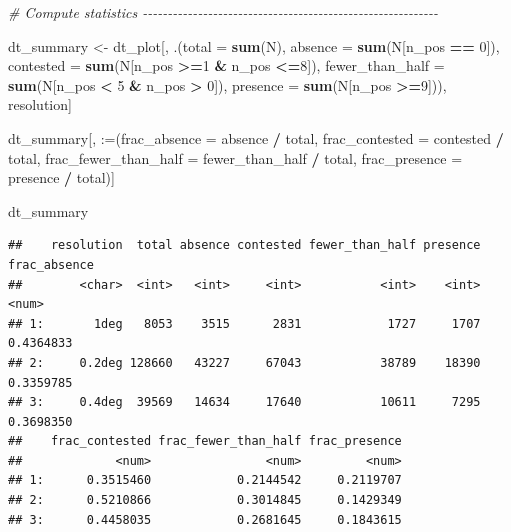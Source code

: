 \documentclass[
  11pt,
]{article}
\newenvironment{Shaded}{\begin{snugshade}}{\end{snugshade}}
\newcommand{\AttributeTok}[1]{\textcolor[rgb]{0.13,0.29,0.53}{#1}}
\newcommand{\CommentTok}[1]{\textcolor[rgb]{0.56,0.35,0.01}{\textit{#1}}}
\newcommand{\DecValTok}[1]{\textcolor[rgb]{0.00,0.00,0.81}{#1}}
\newcommand{\FunctionTok}[1]{\textcolor[rgb]{0.13,0.29,0.53}{\textbf{#1}}}
\newcommand{\NormalTok}[1]{#1}
\newcommand{\OtherTok}[1]{\textcolor[rgb]{0.56,0.35,0.01}{#1}}
\newcommand{\SpecialCharTok}[1]{\textcolor[rgb]{0.81,0.36,0.00}{\textbf{#1}}}
\newcommand{\StringTok}[1]{\textcolor[rgb]{0.31,0.60,0.02}{#1}}
\begin{document}
\begin{Shaded}
\begin{Highlighting}[]
\CommentTok{\# Compute statistics {-}{-}{-}{-}{-}{-}{-}{-}{-}{-}{-}{-}{-}{-}{-}{-}{-}{-}{-}{-}{-}{-}{-}{-}{-}{-}{-}{-}{-}{-}{-}{-}{-}{-}{-}{-}{-}{-}{-}{-}{-}{-}{-}{-}{-}{-}{-}{-}{-}{-}{-}{-}{-}{-}{-}{-}{-}{-}{-}}

\NormalTok{dt\_summary }\OtherTok{\textless{}{-}}\NormalTok{ dt\_plot[, .(}\AttributeTok{total =} \FunctionTok{sum}\NormalTok{(N),}
                          \AttributeTok{absence =} \FunctionTok{sum}\NormalTok{(N[n\_pos }\SpecialCharTok{==} \DecValTok{0}\NormalTok{]),}
                          \AttributeTok{contested =} \FunctionTok{sum}\NormalTok{(N[n\_pos }\SpecialCharTok{\textgreater{}=}\DecValTok{1} \SpecialCharTok{\&}\NormalTok{ n\_pos }\SpecialCharTok{\textless{}=}\DecValTok{8}\NormalTok{]),}
                          \AttributeTok{fewer\_than\_half =} \FunctionTok{sum}\NormalTok{(N[n\_pos }\SpecialCharTok{\textless{}} \DecValTok{5} \SpecialCharTok{\&}\NormalTok{ n\_pos }\SpecialCharTok{\textgreater{}} \DecValTok{0}\NormalTok{]),}
                          \AttributeTok{presence =} \FunctionTok{sum}\NormalTok{(N[n\_pos }\SpecialCharTok{\textgreater{}=}\DecValTok{9}\NormalTok{])),}
\NormalTok{                      resolution]}

\NormalTok{dt\_summary[, }\StringTok{\textasciigrave{}}\AttributeTok{:=}\StringTok{\textasciigrave{}}\NormalTok{(}\AttributeTok{frac\_absence =}\NormalTok{ absence }\SpecialCharTok{/}\NormalTok{ total,}
                  \AttributeTok{frac\_contested =}\NormalTok{ contested }\SpecialCharTok{/}\NormalTok{ total,}
                  \AttributeTok{frac\_fewer\_than\_half =}\NormalTok{ fewer\_than\_half }\SpecialCharTok{/}\NormalTok{ total,}
                  \AttributeTok{frac\_presence =}\NormalTok{ presence }\SpecialCharTok{/}\NormalTok{ total)]}

\NormalTok{dt\_summary}
\end{Highlighting}
\end{Shaded}

\begin{verbatim}
##    resolution  total absence contested fewer_than_half presence frac_absence
##        <char>  <int>   <int>     <int>           <int>    <int>        <num>
## 1:       1deg   8053    3515      2831            1727     1707    0.4364833
## 2:     0.2deg 128660   43227     67043           38789    18390    0.3359785
## 3:     0.4deg  39569   14634     17640           10611     7295    0.3698350
##    frac_contested frac_fewer_than_half frac_presence
##             <num>                <num>         <num>
## 1:      0.3515460            0.2144542     0.2119707
## 2:      0.5210866            0.3014845     0.1429349
## 3:      0.4458035            0.2681645     0.1843615
\end{verbatim}
\end{document}
